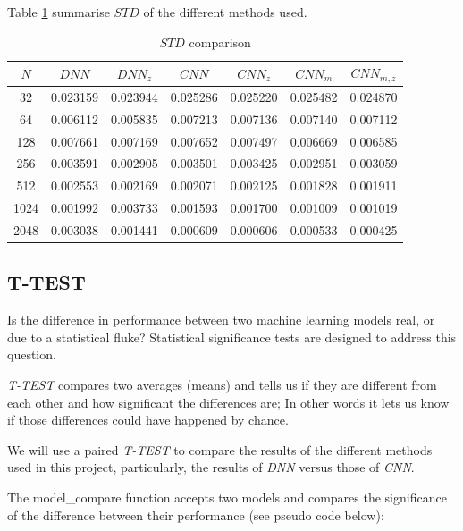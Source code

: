 \documentclass[a4paper, 12pt]{report}
\begin{document}
Table \ref{table:8} summarise $STD$ of the different methods used.
\begin{table}[!h]
    \sffamily
    \scriptsize
    \centering
    \begin{tabular}{||c c c c c c c||} 
        \hline
        $N$ & $DNN$ & $DNN_z$ & $CNN$ & $CNN_z$ & $CNN_m$ & $CNN_{m,z}$ \\ [0.5ex] 
        \hline\hline
    	32 & 0.023159 & 0.023944 & 0.025286 & 0.025220 & 0.025482 & 0.024870 \\
    	\hline
    	64 & 0.006112 & 0.005835 & 0.007213 & 0.007136 & 0.007140 & 0.007112 \\
    	\hline
    	128 & 0.007661 & 0.007169 & 0.007652 & 0.007497 & 0.006669 & 0.006585 \\
    	\hline
    	256 & 0.003591 & 0.002905 & 0.003501 & 0.003425 & 0.002951 & 0.003059 \\
    	\hline
    	512 & 0.002553 & 0.002169 & 0.002071 & 0.002125 & 0.001828 & 0.001911 \\
    	\hline
    	1024 & 0.001992 & 0.003733 & 0.001593 & 0.001700 & 0.001009 & 0.001019 \\
    	\hline
    	2048 & 0.003038 & 0.001441 & 0.000609 & 0.000606 & 0.000533 & 0.000425 \\
	\hline
    \end{tabular}
    \caption{$STD$ comparison}
    \label{table:8}
\end{table}

\newpage
\subsection{T-TEST}
Is the difference in performance between two machine learning models real, or due to a statistical fluke? Statistical significance tests are designed to address this question.

\textit{T-TEST} compares two averages (means) and tells us if they are different from each other and how significant the differences are; In other words it lets us know if those differences could have happened by chance.

We will use a paired \textit{T-TEST} to compare the results of the different methods used in this project, particularly, the results of \textit{DNN} versus those of \textit{CNN}.

The model\_compare function accepts two models and compares the significance of the difference between their performance (see pseudo code below):
\end{document}

